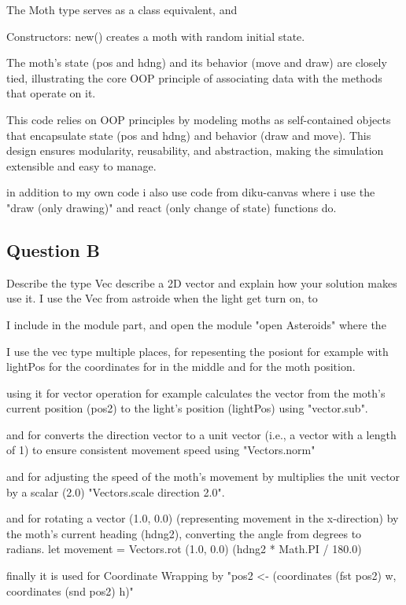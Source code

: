 \documentclass{article}
\begin{document}
The Moth type serves as a class equivalent, and 


Constructors: new() creates a moth with random initial state.



The moth's state (pos and hdng) and its behavior (move and draw) are closely tied, illustrating the core OOP principle of associating data with the methods that operate on it.


This code relies on OOP principles by modeling moths as self-contained objects that encapsulate state (pos and hdng) and behavior (draw and move). This design ensures modularity, reusability, and abstraction, making the simulation extensible and easy to manage.




in addition to my own code i also use code from diku-canvas where i use the "draw (only drawing)" and react (only change of state) functions do.



\subsection{Question B}

Describe the type Vec describe a 2D vector and explain how your solution makes use it. I use the Vec from astroide when the light get turn on, to 


I include in the module part, and open the module "open Asteroids" where the 


I use the vec type multiple places, for repesenting the posiont for example with lightPos for the coordinates for in the middle and for the moth position.

using it for vector operation for example calculates the vector from the moth's current position (pos2) to the light's position (lightPos) using "vector.sub". 

and for converts the direction vector to a unit vector (i.e., a vector with a length of 1) to ensure consistent movement speed using "Vectors.norm"

and for adjusting the speed of the moth’s movement by multiplies the unit vector by a scalar (2.0) "Vectors.scale direction 2.0".

and for rotating a vector (1.0, 0.0) (representing movement in the x-direction) by the moth's current heading (hdng2), converting the angle from degrees to radians. let movement = Vectors.rot (1.0, 0.0) (hdng2 * Math.PI / 180.0)


finally it is used for Coordinate Wrapping by "pos2 <- (coordinates (fst pos2) w, coordinates (snd pos2) h)"
\end{document}

